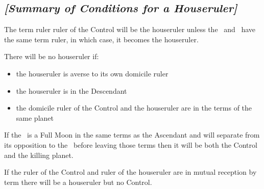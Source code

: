 \newpage
\subsection{\textit{[Summary of Conditions for a Houseruler]}}
\vspace{1em}
\begin{mdframed}[backgroundcolor=cyan!5]
The term ruler ruler of the Control will be the houseruler unless the \Sun\, and \Moon\, have the same term ruler, in which case, it becomes the houseruler.

\noindent There will be no houseruler if:
\vspace{-1em}
\begin{itemize}
\item the houseruler is averse to its own domicile ruler
\item the houseruler is in the Descendant
\item the domicile ruler of the Control and the houseruler are in the terms of the same planet
\end{itemize}

If the \Moon\, is a Full Moon in the same terms as the Ascendant and will separate from its opposition to the \Sun\, before leaving those terms then it will be both the Control and the killing planet.

If the ruler of the Control and ruler of the houseruler are in mutual reception by term there will be a houseruler but no Control.
\end{mdframed}

\newpage